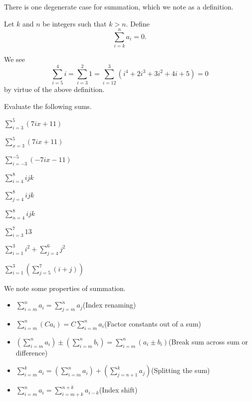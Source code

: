 There is one degenerate case for summation, which we note as a definition.
\begin{definition}
    Let $k$ and $n$ be integers such that $k > n$. Define
    \[
        \sum_{i=k}^{n}a_i = 0.
    \]
\end{definition}
\begin{example}
    We see
    \[
        \sum_{i=5}^{4}i = \sum_{i=3}^{2}1 = \sum_{i=12}^{3}(i^4 + 2i^3 + 3i^2 + 4i + 5) = 0
    \]
    by virtue of the above definition.
\end{example}
\begin{exercise}
    Evaluate the following sums.
    \begin{multicols}{3}
        \begin{partquestions}{\alph*}
            \item $\displaystyle \sum_{i=3}^{5}(7ix+11)$
            \item $\displaystyle \sum_{x=3}^{5}(7ix+11)$
            \item $\displaystyle \sum_{i=-3}^{-5}(-7ix-11)$
            \item $\displaystyle \sum_{i=4}^{8}ijk$
            \item $\displaystyle \sum_{j=4}^{8}ijk$
            \item $\displaystyle \sum_{n=4}^{8}ijk$
            \item $\displaystyle \sum_{i=3}^{7}13$
            \item $\displaystyle \sum_{i=1}^{3}i^2 + \sum_{j=4}^{6}j^2$
            \item $\displaystyle \sum_{i=1}^{3}\left(\sum_{j=5}^{7}(i+j)\right)$
        \end{partquestions}
    \end{multicols}
\end{exercise}

\newpage

We note some properties of summation.
\begin{itemize}
    \item $\displaystyle \sum_{i=m}^na_i = \sum_{j=m}^na_j$\hfill(Index renaming)
    \item $\displaystyle \sum_{i=m}^n(Ca_i) = C\sum_{i=m}^na_i$\hfill(Factor constants out of a sum)
    \item $\displaystyle \left(\sum_{i=m}^na_i\right) \pm \left(\sum_{i=m}^nb_i\right) = \sum_{i=m}^n(a_i \pm b_i)$\hfill(Break sum across sum or difference)
    \item $\displaystyle \sum_{i=m}^ka_i = \left(\sum_{i=m}^na_i\right) + \left(\sum_{j={n+1}}^ka_j\right)$\hfill(Splitting the sum)
    \item $\displaystyle \sum_{i=m}^na_i = \sum_{i=m+k}^{n+k}a_{i-k}$\hfill(Index shift)
\end{itemize}

